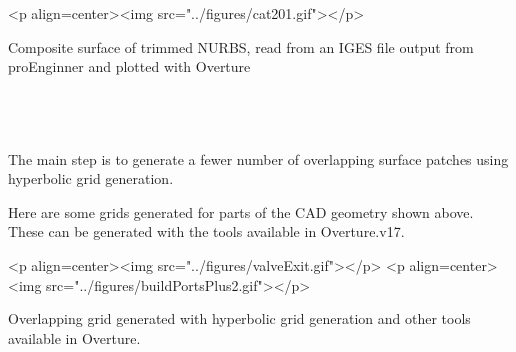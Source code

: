 \documentclass{article}
\begin{document}
\begin{rawhtml}
<p align=center><img  src="../figures/cat201.gif"></p>
\end{rawhtml}
\begin{flushleft}
{\LARGE Composite surface of trimmed NURBS, read from an IGES file output from proEnginner 
    and plotted with Overture} \\
~ \\
~ \\
~ \\
\end{flushleft}

The main step is to generate a fewer number of overlapping surface patches
using hyperbolic grid generation.


Here are some grids generated for parts of the CAD geometry shown above. These can be generated
with the tools available in Overture.v17.

\begin{rawhtml}
<p align=center><img src="../figures/valveExit.gif"></p>
<p align=center><img src="../figures/buildPortsPlus2.gif"></p>
\end{rawhtml}
\begin{flushleft}
{\LARGE Overlapping grid generated with hyperbolic grid generation and other tools available in Overture.} \\
~ \\
~ \\
~ \\
\end{flushleft}
\end{document}
